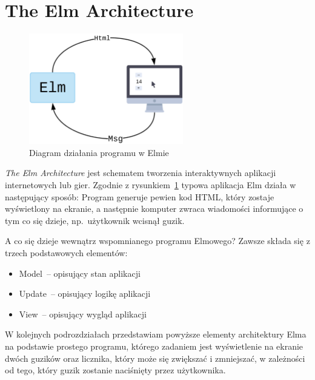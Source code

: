 \documentclass[twoside,a4paper]{report}
\begin{document}
\section{The Elm Architecture}

\begin{figure}[H]
\centering
\includegraphics[width=0.6\textwidth]{elm_arch.png}
\caption{Diagram działania programu w Elmie}\label{fig:elm_arch}
\end{figure}

\textit{The Elm Architecture} jest schematem tworzenia interaktywnych aplikacji internetowych lub gier.
Zgodnie z rysunkiem~\ref{fig:elm_arch} typowa aplikacja Elm działa w następujący sposób:
Program generuje pewien kod HTML, który zostaje wyświetlony na ekranie, a następnie komputer zwraca wiadomości informujące o tym co się dzieje, np.~użytkownik wcisnął guzik.

A co się dzieje wewnątrz wspomnianego programu Elmowego? Zawsze składa się z trzech podstawowych elementów:
\begin{itemize}[noitemsep,topsep=0pt]
    \item Model~-- opisujący stan aplikacji
    \item Update~-- opisujący logikę aplikacji
    \item View~-- opisujący wygląd aplikacji
\end{itemize}
W kolejnych podrozdziałach przedstawiam powyższe elementy architektury Elma na podstawie prostego programu, którego zadaniem jest wyświetlenie na ekranie dwóch guzików oraz licznika, który może się zwiększać i zmniejszać, w zależności od tego, który guzik zostanie naciśnięty przez użytkownika.
\end{document}
